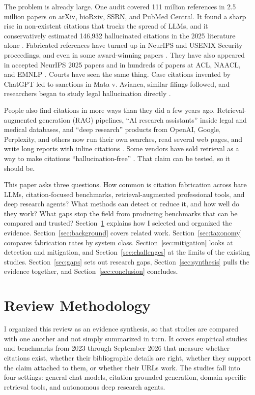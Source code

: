 \documentclass[acmsmall,screen]{acmart}
\begin{document}
The problem is already large. One audit covered 111 million references in 2.5 million papers on arXiv, bioRxiv, SSRN, and PubMed Central. It found a sharp rise in non-existent citations that tracks the spread of LLMs, and it conservatively estimated 146,932 hallucinated citations in the 2025 literature alone \citep{zhao2026}. Fabricated references have turned up in NeurIPS and USENIX Security proceedings, and even in some award-winning papers \citep{russinovich2026b}. They have also appeared in accepted NeurIPS 2025 papers \citep{ansari2026} and in hundreds of papers at ACL, NAACL, and EMNLP \citep{sakai2026}. Courts have seen the same thing. Case citations invented by ChatGPT led to sanctions in Mata v. Avianca, similar filings followed, and researchers began to study legal hallucination directly \citep{dahl2024,magesh2025}.

People also find citations in more ways than they did a few years ago. Retrieval-augmented generation (RAG) pipelines, ``AI research assistants'' inside legal and medical databases, and ``deep research'' products from OpenAI, Google, Perplexity, and others now run their own searches, read several web pages, and write long reports with inline citations \citep{du2025,rao2026}. Some vendors have sold retrieval as a way to make citations ``hallucination-free'' \citep{magesh2025}. That claim can be tested, so it should be.

This paper asks three questions. How common is citation fabrication across bare LLMs, citation-focused benchmarks, retrieval-augmented professional tools, and deep research agents? What methods can detect or reduce it, and how well do they work? What gaps stop the field from producing benchmarks that can be compared and trusted? Section~\ref{sec:methodology} explains how I selected and organized the evidence. Section~\ref{sec:background} covers related work. Section~\ref{sec:taxonomy} compares fabrication rates by system class. Section~\ref{sec:mitigation} looks at detection and mitigation, and Section~\ref{sec:challenges} at the limits of the existing studies. Section~\ref{sec:gaps} sets out research gaps, Section~\ref{sec:synthesis} pulls the evidence together, and Section~\ref{sec:conclusion} concludes.

\section{Review Methodology}\label{sec:methodology}
I organized this review as an evidence synthesis, so that studies are compared with one another and not simply summarized in turn. It covers empirical studies and benchmarks from 2023 through September 2026 that measure whether citations exist, whether their bibliographic details are right, whether they support the claim attached to them, or whether their URLs work. The studies fall into four settings: general chat models, citation-grounded generation, domain-specific retrieval tools, and autonomous deep research agents.
\end{document}
